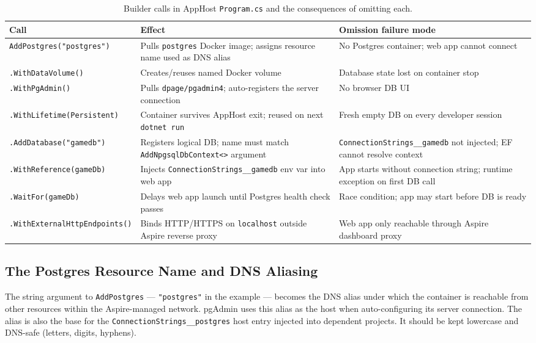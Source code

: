 \begin{table}[H]
\centering
\caption{Builder calls in AppHost \texttt{Program.cs} and the consequences of omitting each.}
\label{tab:builder-calls}
\small
\renewcommand{\arraystretch}{1.15}
\begin{tabularx}{\textwidth}{@{}>{\raggedright\arraybackslash}p{4.5cm} >{\raggedright\arraybackslash}X >{\raggedright\arraybackslash}p{3.5cm}@{}}
\toprule
\textbf{Call} & \textbf{Effect} & \textbf{Omission failure mode} \\
\midrule
\texttt{AddPostgres("postgres")} & Pulls \texttt{postgres} Docker image; assigns resource name used as DNS alias & No Postgres container; web app cannot connect \\
\addlinespace
\texttt{.WithDataVolume()} & Creates/reuses named Docker volume & Database state lost on container stop \\
\addlinespace
\texttt{.WithPgAdmin()} & Pulls \texttt{dpage/pgadmin4}; auto-registers the server connection & No browser DB UI \\
\addlinespace
\texttt{.WithLifetime(Persistent)} & Container survives AppHost exit; reused on next \texttt{dotnet run} & Fresh empty DB on every developer session \\
\addlinespace
\texttt{.AddDatabase("gamedb")} & Registers logical DB; name must match \texttt{AddNpgsqlDbContext<>} argument & \texttt{ConnectionStrings\_\_gamedb} not injected; EF cannot resolve context \\
\addlinespace
\texttt{.WithReference(gameDb)} & Injects \texttt{ConnectionStrings\_\_gamedb} env var into web app & App starts without connection string; runtime exception on first DB call \\
\addlinespace
\texttt{.WaitFor(gameDb)} & Delays web app launch until Postgres health check passes & Race condition; app may start before DB is ready \\
\addlinespace
\texttt{.WithExternalHttpEndpoints()} & Binds HTTP/HTTPS on \texttt{localhost} outside Aspire reverse proxy & Web app only reachable through Aspire dashboard proxy \\
\bottomrule
\end{tabularx}
\end{table}

\subsection{The Postgres Resource Name and DNS Aliasing}

The string argument to \texttt{AddPostgres} --- \texttt{"postgres"} in the example --- becomes the DNS alias under which the container is reachable from other resources within the Aspire-managed network. pgAdmin uses this alias as the host when auto-configuring its server connection. The alias is also the base for the \texttt{ConnectionStrings\_\_postgres} host entry injected into dependent projects. It should be kept lowercase and DNS-safe (letters, digits, hyphens).

